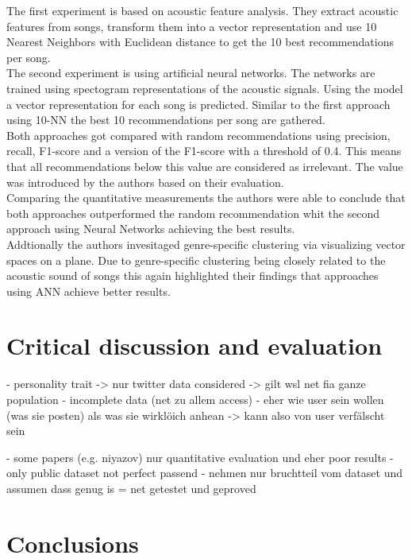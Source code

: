 \documentclass[runningheads,a4paper]{llncs}
\begin{document}
The first experiment is based on acoustic feature analysis. 
They extract acoustic features from songs, transform them into a vector representation and use 10 Nearest Neighbors with Euclidean distance 
to get the 10 best recommendations per song. \\
The second experiment is using artificial neural networks. 
The networks are trained using spectogram representations of the acoustic signals.
Using the model a vector representation for each song is predicted. 
Similar to the first approach using 10-NN the best 10 recommendations per song are gathered. \\
Both approaches got compared with random recommendations using precision, recall, F1-score and a version of the F1-score with a threshold of 0.4.
This means that all recommendations below this value are considered as irrelevant. The value was introduced by the authors based on their evaluation.\\
Comparing the quantitative measurements the authors were able to conclude that both approaches outperformed the random recommendation
whit the second approach using Neural Networks achieving the best results. \\
Addtionally the authors invesitaged genre-specific clustering via visualizing vector spaces on a plane. 
Due to genre-specific clustering being closely related to the acoustic sound of songs this again highlighted their findings that approaches 
using ANN achieve better results. 

\cite{niyazov2021content}

\section{Critical discussion and evaluation}

- personality trait -> nur twitter data considered -> gilt wsl net fia ganze population
- incomplete data (net zu allem access)
- eher wie user sein wollen (was sie posten) als was sie wirklöich anhean -> kann also von user verfälscht sein 

- some papers (e.g. niyazov) nur quantitative evaluation und eher poor results 
- only public dataset not perfect passend 
- nehmen nur bruchtteil vom dataset und assumen dass genug is = net getestet und geproved 




\section{Conclusions}
\end{document}
